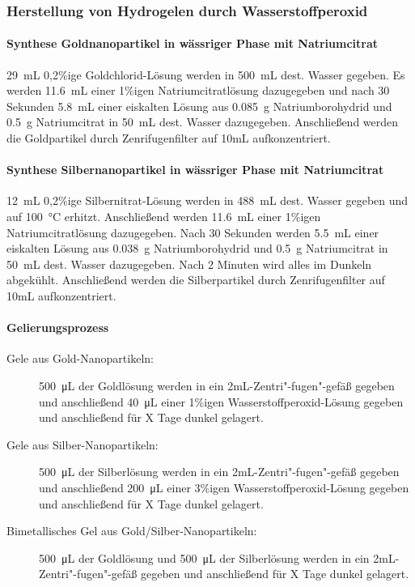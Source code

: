 	\subsubsection{Herstellung von Hydrogelen durch Wasserstoffperoxid}
		\paragraph{Synthese Goldnanopartikel in wässriger Phase mit Natriumcitrat}
		
		\SI{29}{\milli\liter} 0,2\%ige Goldchlorid-Lösung werden in \SI{500}{\milli\liter} dest. Wasser gegeben.
		Es werden \SI{11,6}{\milli\liter} einer 1\%igen Natriumcitratlösung dazugegeben und nach 30 Sekunden \SI{5,8}{\milli\liter}	einer eiskalten Lösung aus \SI{0,085}{\gram} Natriumborohydrid und \SI{0,5}{\gram} Natriumcitrat in \SI{50}{\milli\liter} dest. Wasser dazugegeben.
		Anschließend werden die Goldpartikel durch Zenrifugenfilter auf 10mL aufkonzentriert.
		
		\paragraph{Synthese Silbernanopartikel in wässriger Phase mit Natriumcitrat}
		
		\SI{12}{\milli\liter} 0,2\%ige Silbernitrat-Lösung werden in \SI{488}{\milli\liter} dest. Wasser gegeben und auf \SI{100}{\degreeCelsius} erhitzt.
		Anschließend werden \SI{11,6}{\milli\liter} einer 1\%igen Natriumcitratlösung dazugegeben.
		Nach 30 Sekunden werden  \SI{5,5}{\milli\liter}	einer eiskalten Lösung aus \SI{0,038}{\gram} Natriumborohydrid und \SI{0,5}{\gram} Natriumcitrat in \SI{50}{\milli\liter} dest. Wasser dazugegeben.
		Nach 2 Minuten wird alles im Dunkeln abgekühlt.
		Anschließend werden die Silberpartikel durch Zenrifugenfilter auf 10mL aufkonzentriert.
		
		\paragraph{Gelierungsprozess}
		    \begin{description}
		    \item[Gele aus Gold-Nanopartikeln:]
		    \SI{500}{\micro\liter} der Goldlösung werden in ein 2mL-Zentri"-fugen"-gefäß gegeben und anschließend \SI{40}{\micro\liter} einer 1\%igen Wasserstoffperoxid-Lösung gegeben und anschließend für X Tage dunkel gelagert.
		    \item[Gele aus Silber-Nanopartikeln:]
		    \SI{500}{\micro\liter} der Silberlösung werden in ein 2mL-Zentri"-fugen"-gefäß gegeben und anschließend \SI{200}{\micro\liter} einer 3\%igen Wasserstoffperoxid-Lösung gegeben und anschließend für X Tage dunkel gelagert.
		    \item[Bimetallisches Gel aus Gold/Silber-Nanopartikeln:]
		    \SI{500}{\micro\liter} der Goldlösung und 	\SI{500}{\micro\liter} der Silberlösung werden in ein 2mL-Zentri"-fugen"-gefäß gegeben und anschließend für X Tage dunkel gelagert.
		    \end{description}
		    
